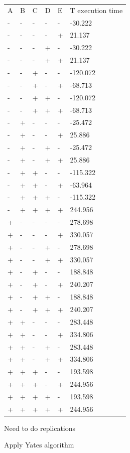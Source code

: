 \documentclass[12pt]{article}
\begin{document}
\begin{table}[]
\begin{tabular}{llllll}
A & B & C & D & E & T execution time \\
- & - & - & - & - &      -30.222     \\
- & - & - & - & + &      21.137      \\
- & - & - & + & - &      -30.222     \\
- & - & - & + & + &      21.137      \\
- & - & + & - & - &      -120.072    \\
- & - & + & - & + &      -68.713     \\
- & - & + & + & - &      -120.072    \\
- & - & + & + & + &      -68.713     \\
- & + & - & - & - &      -25.472     \\
- & + & - & - & + &      25.886      \\
- & + & - & + & - &      -25.472     \\
- & + & - & + & + &      25.886      \\
- & + & + & - & - &      -115.322    \\
- & + & + & - & + &      -63.964     \\
- & + & + & + & - &      -115.322    \\
- & + & + & + & + &      244.956     \\
+ & - & - & - & - &      278.698     \\
+ & - & - & - & + &      330.057     \\
+ & - & - & + & - &      278.698     \\
+ & - & - & + & + &      330.057     \\
+ & - & + & - & - &      188.848     \\
+ & - & + & - & + &      240.207     \\
+ & - & + & + & - &      188.848     \\
+ & - & + & + & + &      240.207     \\
+ & + & - & - & - &      283.448     \\
+ & + & - & - & + &      334.806     \\
+ & + & - & + & - &      283.448     \\
+ & + & - & + & + &      334.806     \\
+ & + & + & - & - &      193.598     \\
+ & + & + & - & + &      244.956     \\
+ & + & + & + & - &      193.598     \\
+ & + & + & + & + &      244.956         
\end{tabular}\end{table}    

Need to do replications

Apply Yates algorithm
\end{document}

